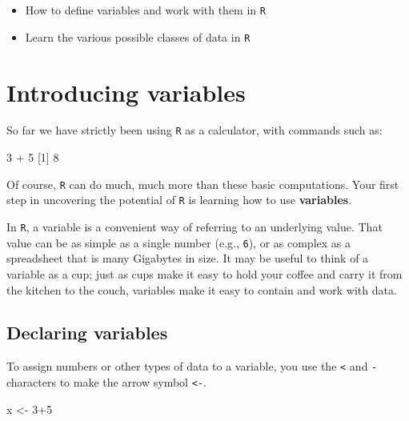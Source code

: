 \documentclass[
]{book}
\newenvironment{Shaded}{\begin{snugshade}}{\end{snugshade}}
\newcommand{\DecValTok}[1]{\textcolor[rgb]{0.00,0.00,0.81}{#1}}
\newcommand{\NormalTok}[1]{#1}
\newcommand{\OtherTok}[1]{\textcolor[rgb]{0.56,0.35,0.01}{#1}}
\newcommand{\SpecialCharTok}[1]{\textcolor[rgb]{0.00,0.00,0.00}{#1}}
\providecommand{\tightlist}{%
  \setlength{\itemsep}{0pt}\setlength{\parskip}{0pt}}
\begin{document}
\begin{itemize}
\tightlist
\item
  How to define variables and work with them in \texttt{R}\\
\item
  Learn the various possible classes of data in \texttt{R}
\end{itemize}

\hypertarget{introducing-variables}{%
\section*{Introducing variables}\label{introducing-variables}}

So far we have strictly been using \texttt{R} as a calculator, with commands such as:

\begin{Shaded}
\begin{Highlighting}[]
\DecValTok{3} \SpecialCharTok{+} \DecValTok{5}
\NormalTok{[}\DecValTok{1}\NormalTok{] }\DecValTok{8}
\end{Highlighting}
\end{Shaded}

Of course, \texttt{R} can do much, much more than these basic computations. Your first step in uncovering the potential of \texttt{R} is learning how to use \textbf{variables}.

In \texttt{R}, a variable is a convenient way of referring to an underlying value. That value can be as simple as a single number (e.g., \texttt{6}), or as complex as a spreadsheet that is many Gigabytes in size. It may be useful to think of a variable as a cup; just as cups make it easy to hold your coffee and carry it from the kitchen to the couch, variables make it easy to contain and work with data.

\hypertarget{declaring-variables}{%
\subsection*{Declaring variables}\label{declaring-variables}}

To assign numbers or other types of data to a variable, you use the \texttt{\textless{}} and \texttt{-} characters to make the arrow symbol \texttt{\textless{}-}.

\begin{Shaded}
\begin{Highlighting}[]
\NormalTok{x }\OtherTok{\textless{}{-}} \DecValTok{3}\SpecialCharTok{+}\DecValTok{5}
\end{Highlighting}
\end{Shaded}
\end{document}
